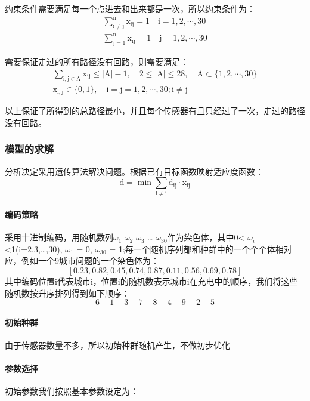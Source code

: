 \documentclass{article}
\begin{document}
约束条件需要满足每一个点进去和出来都是一次，所以约束条件为：
\begin{gather}    %
    \mathrm {\sum_{i \neq j}^{n} x_{i j}=1 \quad \mathrm{i}=1,2, \cdots, 30} \tag{8}\\
    \mathrm {\sum_{j=1}^{n} x_{i j}=\underline{1} \quad \mathrm{j}=1,2, \cdots, 30} \tag{9}           
\end{gather}    

需要保证走过的所有路径没有回路，则需要满足：
\begin{gather}    %
    \mathrm {\sum_{i, j \in A} x_{i j} \leqslant|A|-1, \quad 2 \leqslant |A| \leqslant 28,\quad A \subset \{1,2, \cdots, 30\}} \tag{10}\\
    \mathrm {x_{i , j} \in\{0,1\}, \quad i = j =1,2, \cdots, 30 ; \mathrm{i} \neq j} \tag{11}      
\end{gather} 

以上保证了所得到的总路径最小，并且每个传感器有且只经过了一次，走过的路径没有回路。

\subsubsection{模型的求解}
分析决定采用遗传算法解决问题。根据已有目标函数映射适应度函数：
$$\mathrm{d=\min \sum_{i \neq j} d_{i j} \cdot x_{i j}}$$

\paragraph{编码策略}
采用十进制编码，用随机数列$\omega_1$ $\omega_2$ $\omega_3$ … $\omega_{30}$作为染色体，其中0< $\omega_i$ <1(i=2,3,…,30), $\omega_1$ = 0, $\omega_{30}$ = 1;每一个随机序列都和种群中的一个个个体相对应，例如一个9城市问题的一个染色体为：
$$\left[0.23,0.82,0.45,0.74,0.87,0.11,0.56,0.69,0.78\right]$$
其中编码位置i代表城市i，位置i的随机数表示城市i在充电中的顺序，我们将这些随机数按升序排列得到如下顺序：
$$6-1-3-7-8-4-9-2-5$$

\paragraph{初始种群}
由于传感器数量不多，所以初始种群随机产生，不做初步优化

\paragraph{参数选择}
初始参数我们按照基本参数设定为：
\end{document}
